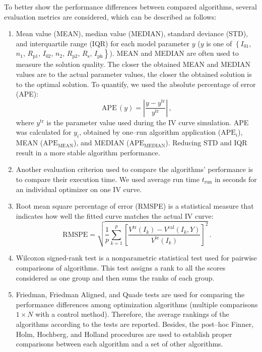 \documentclass[a4paper,fleqn]{cas-dc}
\begin{document}
To better show the performance differences between compared algorithms,
several evaluation metrics are considered, which can be described as follows:
\begin{enumerate}[1.]
\item
Mean value (MEAN), median value (MEDIAN), standard deviance (STD), and interquartile range (IQR)
for each model parameter $y$
($y$ is one of $\left\{I_{01}\right.$, $n_1$, $R_\mathrm{p1}$, $I_{02}$, $n_2$, $R_\mathrm{p2}$, $R_\mathrm{s}$, $\left.I_\mathrm{ph}\right\}$).
MEAN and MEDIAN are often used to measure the solution quality.
The closer the obtained MEAN and MEDIAN values are to the actual parameter values,
the closer the obtained solution is to the optimal solution.
To quantify, we used the  absolute percentage of error (APE):
\begin{equation}
\label{eqAPE}
\mathrm{APE}\,(y)= \left| \frac{y-y^\mathrm{tr}}{y^\mathrm{tr}}\right|\,,
\end{equation}
where
$y^\mathrm{tr}$ is the parameter value used during the IV curve simulation.
APE was calculated for $y_i$, obtained by one--run algorithm application ($\mathrm{APE}_i$),
MEAN ($\mathrm{APE}_\mathrm{MEAN}$), and MEDIAN ($\mathrm{APE}_\mathrm{MEDIAN}$).
Reducing STD and IQR result in a more stable algorithm performance.

\item
Another evaluation criterion used to compare the algorithms’ performance is to compare their execution time.
We used average run time $t_\mathrm{run}$ in seconds for an
individual optimizer on one IV curve.

\item
Root mean square percentage of error (RMSPE) is a statistical measure that indicates
how well the fitted curve matches the actual IV curve:
\begin{equation}
\label{eqRMSPE}
\mathrm{RMSPE}= \sqrt{\frac{1}{p} \sum_{k=1}^p \left[\frac{V^\mathrm{tr}(I_k)-V^\mathrm{cal}(I_k,Y)}{V^\mathrm{tr}(I_k)} \right]^2}\,.
\end{equation}

\item
Wilcoxon signed-rank test is a nonparametric statistical test used for pairwise comparisons of algorithms.
This test assigns a rank to all the scores considered as one group and then sums the ranks of each group.

\item
Friedman, Friedman Aligned, and Quade tests are used for comparing the performance differences
among optimization algorithms
(multiple comparisons $1\times N$ with a control method).
Therefore, the average rankings of the algorithms according to the
tests are reported.
Besides, the post--hoc  Finner, Holm, Hochberg, and Holland procedures
are used to establish proper comparisons between each algorithm and a set of other algorithms.


\end{enumerate}
\end{document}
